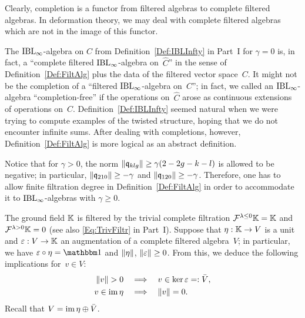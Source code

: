 \documentclass[\MainFolder/Text.tex]{subfiles}
\begin{document}
\begin{Remark}
\begin{RemarkList}
\item Clearly, completion is a functor from filtered algebras to complete filtered algebras. In deformation theory, we may deal with complete filtered algebras which are not in the image of this functor.
\item  The $\mathrm{IBL}_\infty$-algebra on $C$ from Definition~\ref{Def:IBLInfty} in Part~I for $\gamma = 0$ is, in fact, a ``complete filtered $\mathrm{IBL}_\infty$-algebra on~$\hat{C}$'' in the sense of Definition~\ref{Def:FiltAlg} plus the data of the filtered vector space~$C$. It might not be the completion of a ``filtered $\mathrm{IBL}_\infty$-algebra on~$C$''; in fact, we called an $\mathrm{IBL}_\infty$-algebra ``completion-free'' if the operations on~$\hat{C}$ arose as continuous extensions of operations on~$C$. Definition~\ref{Def:IBLInfty} seemed natural when we were trying to compute examples of the twisted structure, hoping that we do not encounter infinite sums. After dealing with completions, however, Definition~\ref{Def:FiltAlg} is more logical as an abstract definition.

Notice that for $\gamma > 0$, the norm $\| \mathfrak{q}_{klg} \| \ge \gamma(2-2g-k-l)$ is allowed to be negative; in particular, $\| \mathfrak{q}_{210} \|\ge -\gamma$ and $\| \mathfrak{q}_{120} \|\ge -\gamma$. Therefore, one has to allow finite filtration degree in Definition~\ref{Def:FiltAlg} in order to accommodate it to $\mathrm{IBL}_\infty$-algebras with $\gamma \ge 0$.
\end{RemarkList}
\end{Remark}

\begin{Remark}\label{Rem:FiltrUnitAug}
The ground field $\mathbb{K}$ is filtered by the trivial complete filtration $\mathcal{F}^{\lambda\le 0}\mathbb{K} = \mathbb{K}$ and $\mathcal{F}^{\lambda>0}\mathbb{K} = 0$ (see also \eqref{Eq:TrivFiltr} in Part~I). Suppose that $\eta: \mathbb{K} \rightarrow V$ is a unit and $\varepsilon: V \rightarrow \mathbb{K}$ an augmentation of a complete filtered algebra~$V$; in particular, we have $\MVAug \circ \MVUnit = \Id$ and $\| \eta \|$, $\| \varepsilon \|\ge 0$. From this, we deduce the following implications for~$v\in V$:
\begin{align*}
\Norm{v}>0 &\quad\Implies\quad v\in \ker \MVAug =: \bar{V},\\
v\in \im \MVUnit &\quad\Implies\quad \Norm{v} = 0.
\end{align*}
Recall that $V = \operatorname{im} \eta \oplus \bar{V}$.
\end{Remark}
\end{document}
